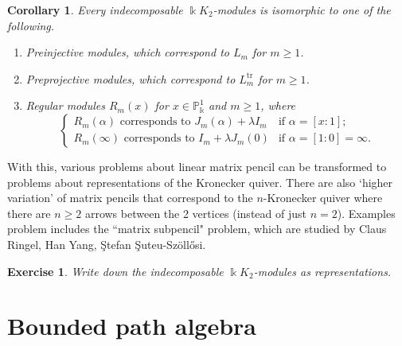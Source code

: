 \documentclass[11pt,a4paper]{article}
\makeatletter
\numberwithin{equation}{section}
\renewenvironment{proof}[1][\proofname]{\par
    \pushQED{\qed}%
    \normalfont \topsep0\p@\@plus6\p@ \labelsep1em\relax
    \trivlist
    \item[\hskip\labelsep\indent
        \bfseries #1]\ignorespaces
    \mbox{}
}{
    \popQED\endtrivlist\@endpefalse
}
\theoremstyle{all}
\newtheorem{corollary}[theorem]{Corollary}
\newtheorem{exercise}[theorem]{Exercise}
\theoremstyle{remark}
\makeatother
\begin{document}
\begin{corollary}
Every indecomposable $\Bbbk K_2$-modules is isomorphic to one of the following.
\begin{enumerate}
\item Preinjective modules, which correspond to $L_m$ for $m\ge 1$.
\item Preprojective modules, which correspond to $L_m^{\mathrm{tr}}$ for $m\ge 1$.
\item Regular modules $R_m(x)$ for $x\in \mathbb{P}_{\Bbbk}^1$ and $m\ge 1$, where
\[
\begin{cases}
R_m(\alpha) \text{ corresponds to } J_m(\alpha)+\lambda I_m & \text{if $\alpha=[x:1]$;}\\
R_m(\infty) \text{ corresponds to } I_m+\lambda J_m(0)& \text{if $\alpha=[1:0]=\infty$.}
\end{cases}
\]
\end{enumerate}
\end{corollary}

With this, various problems about linear matrix pencil can be transformed to problems about representations of the Kronecker quiver.  There are also `higher variation' of matrix pencils that correspond to the $n$-Kronecker quiver where there are $n\ge 2$ arrows between the 2 vertices (instead of just $n=2$).
Examples problem includes the ``matrix subpencil" problem, which are studied by Claus Ringel, Han Yang, \c{S}tefan \c{S}uteu-Sz\"{o}ll\H{o}si.

\begin{exercise}
Write down the indecomposable $\Bbbk K_2$-modules as representations.
\end{exercise}



\pagebreak

\section{Bounded path algebra}
\end{document}
